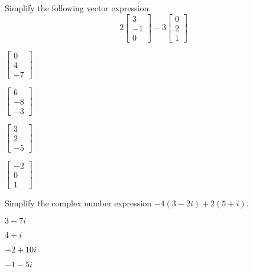 \begin{readinessAssuranceTest}

\item Simplify the following vector expression.
  \[
  2
  \begin{bmatrix}
    3 \\ -1 \\ 0
  \end{bmatrix}-
  3
  \begin{bmatrix}
    0 \\ 2 \\ 1
  \end{bmatrix}
  \]

\begin{multicols}{4}
\begin{readinessAssuranceTestChoices}
\item \(
        \begin{bmatrix}
          0 \\ 4 \\ -7
        \end{bmatrix}
      \)
\item \(
        \begin{bmatrix}
          6 \\ -8 \\ -3
        \end{bmatrix}
      \)
\item \(
        \begin{bmatrix}
          3 \\ 2 \\ -5
        \end{bmatrix}
      \)
\item \(
        \begin{bmatrix}
          -2 \\ 0 \\ 1
        \end{bmatrix}
      \)
\end{readinessAssuranceTestChoices}
\end{multicols}

\item Simplify the complex number expression
      \(-4(3-2i)+2(5+i)\).

\begin{multicols}{4}
\begin{readinessAssuranceTestChoices}
\item \(3-7i\)
\item \(4+i\)
\item \(-2+10i\)
\item \(-1-5i\)
\end{readinessAssuranceTestChoices}
\end{multicols}


\end{readinessAssuranceTest}
